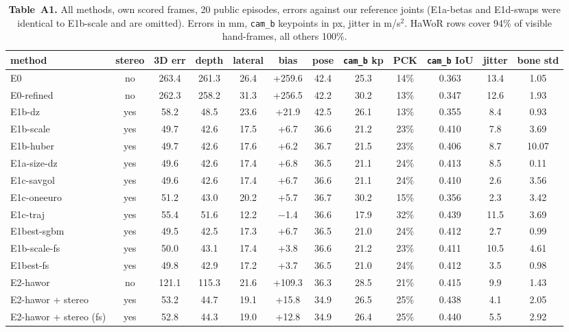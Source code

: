 \documentclass[10pt]{article}
\begin{document}
\begin{table}[H]\small\centering
\setlength{\tabcolsep}{4pt}
\begin{tabular}{@{}lccccccccccc@{}}
\toprule
method & stereo & 3D err & depth & lateral & bias & pose & \texttt{cam\_b} kp & PCK & \texttt{cam\_b} IoU & jitter & bone std \\
\midrule
E0 & no & 263.4 & 261.3 & 26.4 & +259.6 & 42.4 & 25.3 & 14\% & 0.363 & 13.4 & 1.05 \\
E0-refined & no & 262.3 & 258.2 & 31.3 & +256.5 & 42.2 & 30.2 & 13\% & 0.347 & 12.6 & 1.93 \\
E1b-dz & yes & 58.2 & 48.5 & 23.6 & +21.9 & 42.5 & 26.1 & 13\% & 0.355 & 8.4 & 0.93 \\
E1b-scale & yes & 49.7 & 42.6 & 17.5 & +6.7 & 36.6 & 21.2 & 23\% & 0.410 & 7.8 & 3.69 \\
E1b-huber & yes & 49.7 & 42.6 & 17.6 & +6.2 & 36.7 & 21.5 & 23\% & 0.406 & 8.7 & 10.07 \\
E1a-size-dz & yes & 49.6 & 42.6 & 17.4 & +6.8 & 36.5 & 21.1 & 24\% & 0.413 & 8.5 & 0.11 \\
E1c-savgol & yes & 49.6 & 42.6 & 17.4 & +6.7 & 36.6 & 21.1 & 24\% & 0.410 & 2.6 & 3.56 \\
E1c-oneeuro & yes & 51.2 & 43.0 & 20.2 & +5.7 & 36.7 & 30.2 & 15\% & 0.356 & 2.3 & 3.42 \\
E1c-traj & yes & 55.4 & 51.6 & 12.2 & $-$1.4 & 36.6 & 17.9 & 32\% & 0.439 & 11.5 & 3.69 \\
E1best-sgbm & yes & 49.5 & 42.5 & 17.3 & +6.7 & 36.5 & 21.0 & 24\% & 0.412 & 2.7 & 0.99 \\
E1b-scale-fs & yes & 50.0 & 43.1 & 17.4 & +3.8 & 36.6 & 21.2 & 23\% & 0.411 & 10.5 & 4.61 \\
E1best-fs & yes & 49.8 & 42.9 & 17.2 & +3.7 & 36.5 & 21.0 & 24\% & 0.412 & 3.5 & 0.98 \\
E2-hawor & no & 121.1 & 115.3 & 21.6 & +109.3 & 36.3 & 28.5 & 21\% & 0.415 & 9.9 & 1.43 \\
E2-hawor + stereo & yes & 53.2 & 44.7 & 19.1 & +15.8 & 34.9 & 26.5 & 25\% & 0.438 & 4.1 & 2.05 \\
E2-hawor + stereo (fs) & yes & 52.8 & 44.3 & 19.0 & +12.8 & 34.9 & 26.4 & 25\% & 0.440 & 5.5 & 2.92 \\
\bottomrule
\end{tabular}
\caption*{\textbf{Table~A1.} All methods, own scored frames, 20 public episodes, errors against our reference joints
(E1a-betas and E1d-swaps were identical to E1b-scale and are omitted). Errors in mm, \texttt{cam\_b} keypoints in px, jitter
in m/s$^2$. HaWoR rows cover 94\% of visible hand-frames, all others 100\%.}
\end{table}
\end{document}
